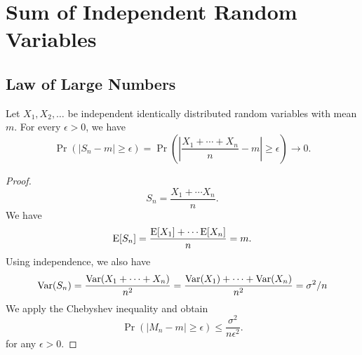 \chapter{Sum of Independent Random Variables}

\section{Law of Large Numbers}

\begin{theorem}
Let $X_1, X_2, \ldots$ be independent identically distributed random variables with mean $m$.
For every $\epsilon > 0$, we have
\begin{equation*}
\Pr \left( |S_n - m| \geq \epsilon \right)
= \Pr \left( \left| \frac{X_1 + \cdots + X_n}{n} - m \right| \geq \epsilon \right) \rightarrow 0.
\end{equation*}
\end{theorem}
\begin{proof}
\begin{equation*}
S_n = \frac{X_1 + \cdots X_n}{n} .
\end{equation*}
We have
\begin{equation*}
\mathrm{E} [S_n] = 
\frac{\mathrm{E} [X_1] + \cdots \mathrm{E} [X_n]}{n} = m .
\end{equation*}
Using independence, we also have
\begin{equation*}
\mathrm{Var} (S_n) = \frac{ \mathrm{Var}( X_1 + \cdots + X_n )}{n^2}
= \frac{ \mathrm{Var}( X_1 ) + \cdots + \mathrm{Var}(X_n )}{n^2}
= \sigma^2 / n
\end{equation*}
We apply the Chebyshev inequality and obtain
\begin{equation*}
\Pr (|M_n - m| \geq \epsilon) \leq \frac{ \sigma^2}{n \epsilon^2} .
\end{equation*}
for any $\epsilon > 0$.
\end{proof}

